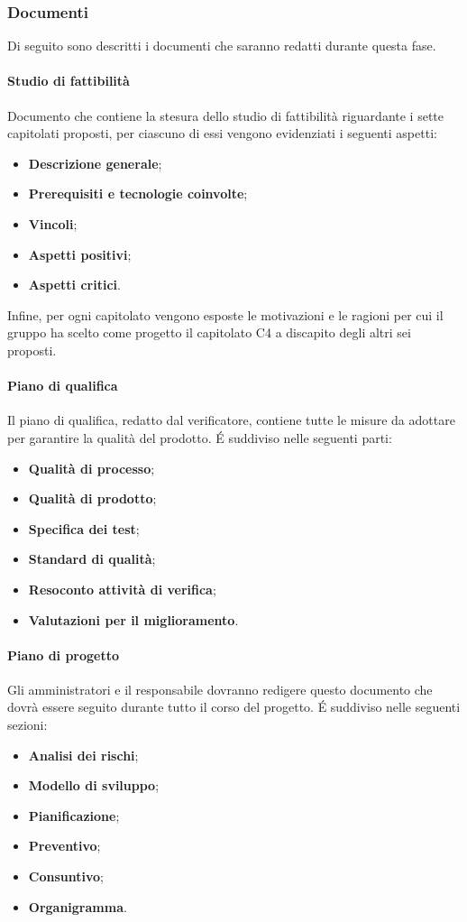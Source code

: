 \subsubsection{Documenti}
Di seguito sono descritti i documenti che saranno redatti durante questa fase.
\paragraph{Studio di fattibilità}
Documento che contiene la stesura dello studio di fattibilità riguardante i sette capitolati proposti, per ciascuno di essi vengono evidenziati i seguenti aspetti:
\begin{itemize}
    \item \textbf{Descrizione generale};
    \item \textbf{Prerequisiti e tecnologie coinvolte};
    \item \textbf{Vincoli};
    \item \textbf{Aspetti positivi};
    \item \textbf{Aspetti critici}.
\end{itemize}
Infine, per ogni capitolato vengono esposte le motivazioni e le ragioni per cui il gruppo ha scelto come progetto il capitolato C4 \NomeProgetto{} a discapito degli altri sei proposti.\\
\paragraph{Piano di qualifica}
Il piano di qualifica, redatto dal verificatore, contiene tutte le misure da adottare per garantire la qualità del prodotto. \'E suddiviso nelle seguenti parti:
\begin{itemize}
\item \textbf{Qualità di processo};
\item \textbf{Qualità di prodotto};
\item \textbf{Specifica dei test};
\item \textbf{Standard di qualità};
\item \textbf{Resoconto attività di verifica};
\item \textbf{Valutazioni per il miglioramento}.
\end{itemize} 
\paragraph{Piano di progetto}
Gli amministratori e il responsabile dovranno redigere questo documento che dovrà essere seguito durante tutto il corso del progetto. \'E suddiviso nelle seguenti sezioni:
\begin{itemize}
    \item \textbf{Analisi dei rischi};
    \item \textbf{Modello di sviluppo};
   \item \textbf{Pianificazione};  
    \item \textbf{Preventivo};
    \item \textbf{Consuntivo};
    \item \textbf{Organigramma}.   
\end{itemize}
